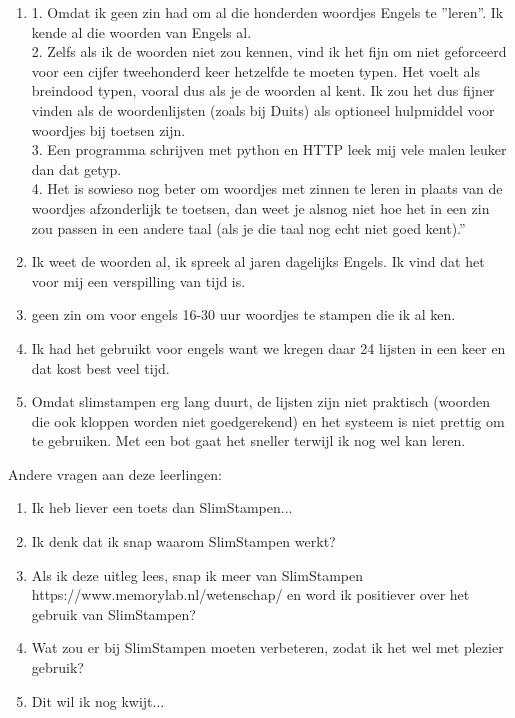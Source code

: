 \documentclass[12pt, a4paper]{article}
\begin{document}
\begin{enumerate}
    \item 1. Omdat ik geen zin had om al die honderden woordjes Engels te ''leren''. Ik kende al die woorden van Engels al.\\
     2. Zelfs als ik de woorden niet zou kennen, vind ik het fijn om niet geforceerd voor een cijfer tweehonderd keer hetzelfde te moeten typen. Het voelt als breindood typen, vooral dus als je de woorden al kent. Ik zou het dus fijner vinden als de woordenlijsten (zoals bij Duits) als optioneel hulpmiddel voor woordjes bij toetsen zijn.\\
    3. Een programma schrijven met python en HTTP leek mij vele malen leuker dan dat getyp.\\   
    4. Het is sowieso nog beter om woordjes met zinnen te leren in plaats van de woordjes afzonderlijk te toetsen, dan weet je alsnog niet hoe het in een zin zou passen in een andere taal (als je die taal nog echt niet goed kent).''\\
    \item Ik weet de woorden al, ik spreek al jaren dagelijks Engels. Ik vind dat het voor mij een verspilling van tijd is.\\
    \item geen zin om voor engels 16-30 uur woordjes te stampen die ik al ken. \\
    \item Ik had het gebruikt voor engels want we kregen daar 24 lijsten in een keer en dat kost best veel tijd.\\
    \item Omdat slimstampen erg lang duurt, de lijsten zijn niet praktisch (woorden die ook kloppen worden niet goedgerekend) en het systeem is niet prettig om te gebruiken. Met een bot gaat het sneller terwijl ik nog wel kan leren.\\
\end{enumerate}

Andere vragen aan deze leerlingen:\\
\begin{enumerate}
    \item Ik heb liever een toets dan SlimStampen...
    \item Ik denk dat ik snap waarom SlimStampen werkt?
    \item Als ik deze uitleg lees, snap ik meer van SlimStampen\\
     https://www.memorylab.nl/wetenschap/ en word ik positiever over het gebruik van SlimStampen?
    \item Wat zou er bij SlimStampen moeten verbeteren, zodat ik het wel met plezier gebruik?
    \item Dit wil ik nog kwijt...
\end{enumerate}

\newpage
 

\end{document}
